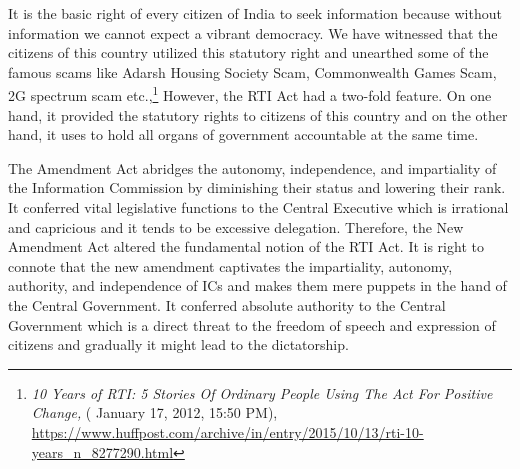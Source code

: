 \begin{multicols}{2}
\noi
It is the basic right of every citizen of India to seek information because without information
we cannot expect a vibrant democracy. We have witnessed that the citizens of this country
utilized this statutory right and unearthed some of the famous scams like Adarsh Housing
Society Scam, Commonwealth Games Scam, 2G spectrum scam etc.,\footnote{\textit{10 Years of RTI: 5 Stories Of Ordinary People Using The Act For Positive Change,} ( January 17, 2012, 15:50
PM), \url{https://www.huffpost.com/archive/in/entry/2015/10/13/rti-10-years_n_8277290.html}} However, the RTI Act
had a two-fold feature. On one hand, it provided the statutory rights to citizens of this country
and on the other hand, it uses to hold all organs of government accountable at the same time. 

\noi
The Amendment Act abridges the autonomy, independence, and impartiality of the
Information Commission by diminishing their status and lowering their rank. It conferred
vital legislative functions to the Central Executive which is irrational and capricious and it
tends to be excessive delegation. Therefore, the New Amendment Act altered the
fundamental notion of the RTI Act. It is right to connote that the new amendment captivates
the impartiality, autonomy, authority, and independence of ICs and makes them mere puppets
in the hand of the Central Government. It conferred absolute authority to the Central
Government which is a direct threat to the freedom of speech and expression of citizens and
gradually it might lead to the dictatorship.

\end{multicols}
